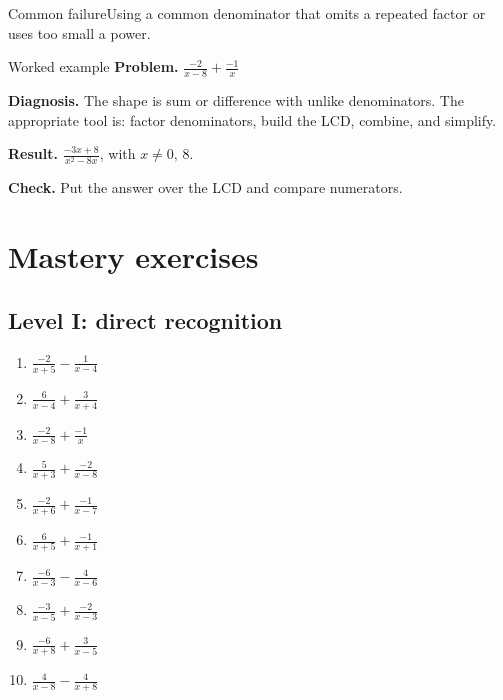 \documentclass[11pt,oneside]{book}
\begin{document}
\begin{warningbox}{Common failure}Using a common denominator that omits a repeated factor or uses too small a power.\end{warningbox}
\begin{examplebox}{Worked example}
\textbf{Problem.} $\displaystyle \frac{-2}{x - 8}+\frac{-1}{x}$

\textbf{Diagnosis.} The shape is sum or difference with unlike denominators. The appropriate tool is: factor denominators, build the LCD, combine, and simplify.

\textbf{Result.} $\displaystyle \frac{- 3 x + 8}{x^{2} - 8 x}$, with $x\ne 0,\,8$.

\textbf{Check.} Put the answer over the LCD and compare numerators.
\end{examplebox}
\section{Mastery exercises}
\subsection*{Level I: direct recognition}
\begin{enumerate}[leftmargin=*,label=\textbf{\arabic*.},itemsep=0.65\baselineskip]
\item $\displaystyle \frac{-2}{x + 5}-\frac{1}{x - 4}$
\item $\displaystyle \frac{6}{x - 4}+\frac{3}{x + 4}$
\item $\displaystyle \frac{-2}{x - 8}+\frac{-1}{x}$
\item $\displaystyle \frac{5}{x + 3}+\frac{-2}{x - 8}$
\item $\displaystyle \frac{-2}{x + 6}+\frac{-1}{x - 7}$
\item $\displaystyle \frac{6}{x + 5}+\frac{-1}{x + 1}$
\item $\displaystyle \frac{-6}{x - 3}-\frac{4}{x - 6}$
\item $\displaystyle \frac{-3}{x - 5}+\frac{-2}{x - 3}$
\item $\displaystyle \frac{-6}{x + 8}+\frac{3}{x - 5}$
\item $\displaystyle \frac{4}{x - 8}-\frac{4}{x + 8}$
\end{enumerate}
\end{document}
